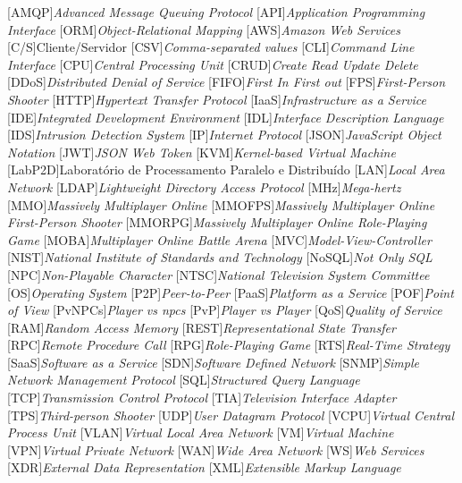 \begin{acronym}[]
	[AMQP]{{\it Advanced Message Queuing Protocol}}
	[API]{{\it Application Programming Interface}}
	[ORM]{{\it Object-Relational Mapping}}
  	[AWS]{{\it Amazon Web Services}}
	[C/S]{{Cliente/Servidor}}
	[CSV]{{\it Comma-separated values}}
	[CLI]{{\it Command Line Interface}}
	[CPU]{{\it Central Processing Unit}}
	[CRUD]{{\it Create Read Update Delete}}
	[DDoS]{{\it Distributed Denial of Service}}
	[FIFO]{{\it First In First out}}
	[FPS]{{\it First-Person Shooter}}
	[HTTP]{{\it Hypertext Transfer Protocol}}
	[IaaS]{{\it Infrastructure as a Service}}
	[IDE]{{\it Integrated Development Environment}}
	[IDL]{{\it Interface Description Language}}
	[IDS]{{\it Intrusion Detection System}}
	[IP]{{\it Internet Protocol}}  
	[JSON]{{\it JavaScript Object Notation}}
	[JWT]{{\it JSON Web Token}}
	[KVM]{{\it Kernel-based Virtual Machine}}
	[LabP2D]{{Laboratório de Processamento Paralelo e Distribuído}}
	[LAN]{{\it Local Area Network}}
  	[LDAP]{{\it Lightweight Directory Access Protocol}}
	[MHz]{{\it Mega-hertz}}
	[MMO]{{\it Massively Multiplayer Online}}
	[MMOFPS]{{\it Massively Multiplayer Online First-Person Shooter}}
	[MMORPG]{{\it Massively Multiplayer Online Role-Playing Game}}
	[MOBA]{{\it Multiplayer Online Battle Arena}}
	[MVC]{{\it Model-View-Controller}}
	[NIST]{{\it National Institute of Standards and Technology}}
	[NoSQL]{{\it Not Only SQL}}
	[NPC]{{\it Non-Playable Character}}
	[NTSC]{{\it National Television System Committee}}
	[OS]{{\it Operating System}}
	[P2P]{{\it Peer-to-Peer}}
	[PaaS]{{\it Platform as a Service}}
	[POF]{{\it Point of View}}
	[PvNPCs]{{\it Player vs \acp{npc}}}
	[PvP]{{\it Player vs Player}}
	[QoS]{{\it Quality of Service}}
	[RAM]{{\it Random Access Memory}}
	[REST]{{\it Representational State Transfer}}
	[RPC]{{\it Remote Procedure Call}}
	[RPG]{{\it Role-Playing Game}}
	[RTS]{{\it Real-Time Strategy}}
	[SaaS]{{\it Software as a Service}}
	[SDN]{{\it Software Defined Network}}
	[SNMP]{{\it Simple Network Management Protocol}}
	[SQL]{{\it Structured Query Language}}
	[TCP]{{\it Transmission Control Protocol}}
	[TIA]{{\it Television Interface Adapter}}
	[TPS]{{\it Third-person Shooter}}
	[UDP]{{\it User Datagram Protocol}}
	[VCPU]{{\it Virtual Central Process Unit}}
	[VLAN]{{\it Virtual Local Area Network}}
	[VM]{{\it Virtual Machine}}
	[VPN]{{\it Virtual Private Network}}
	[WAN]{{\it Wide Area Network}}
	[WS]{{\it Web Services}}
	[XDR]{{\it External Data Representation}}
	[XML]{{\it Extensible Markup Language}}




\end{acronym}
